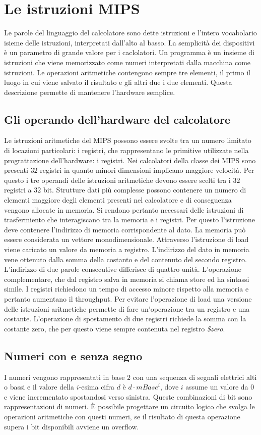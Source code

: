 \chapter{Le istruzioni MIPS}
Le parole del linguaggio del calcolatore sono dette istruzioni e l'intero vocabolario isieme delle istruzioni, interpretati dall'alto al basso. La semplicit\`a dei dispositivi 
\`e un parametro di grande valore per i caclolatori. Un programma \`e un insieme di istruzioni che viene memorizzato come numeri interpretati dalla macchina come istruzioni.
Le operazioni aritmetiche contengono sempre tre elementi, il primo il luogo in cui viene salvato il risultato e gli altri due i due elementi. Questa descrizione permette di 
mantenere l'hardware semplice. 
\section{Gli operando dell'hardware del calcolatore}
Le istruzioni aritmetiche del MIPS possono essere svolte tra un numero limitato di locazioni particolari: i registri, che rappresentano le primitive utilizzate nella 
prograttazione dell'hardware: i registri. Nei calcolatori della classe dei MIPS sono presenti $32$ registri in quanto minori dimensioni implicano maggiore velocit\`a. Per
questo i tre operandi delle istruzioni aritmetiche devono essere scelti tra i $32$ registri a $32$ bit. Strutture dati pi\`u complesse possono contenere un numero di elementi
maggiore degli elementi presenti nel calcolatore e di conseguenza vengono allocate in memoria. Si rendono pertanto necessari delle istruzioni di trasfermiento che interagiscano
tra la memoria e i registri. Per questo l'istruzione deve contenere l'indirizzo di memoria corrispondente al dato. La memoria pu\`o essere considerata un vettore 
monodimensionale. Attraverso l'istruzione di load viene caricato un valore da memoria a registro. L'indirizzo del dato in memoria vene ottenuto dalla somma della costanto e del
contenuto del secondo registro. L'indirizzo di due parole consecutive differisce di quattro unit\`a. L'operazione complementare, che dal registro salva in memoria si chiama 
store ed ha sintassi simile. I registri richiedono un tempo di accesso minore rispetto alla memoria e pertanto aumentano il throughput. Per evitare l'operazione di load una 
versione delle istruzioni aritmetiche permette di fare un'operazione tra un registro e una costante. L'operazione di spostamento di due registri richiede la somma con la 
costante zero, che per questo viene sempre contenuta nel registro \emph{\$zero}.
\section{Numeri con e senza segno}
I numeri vengono rappresentati in base $2$ con una sequenza di segnali elettrici alti o bassi e il valore della $i$-esima cifra $d$ \`e $d\cdot mBase^i$, dove $i$ assume un 
valore da $0$ e viene incrementato spostandosi verso sinistra. Queste combinazioni di bit sono rappresentazioni di numeri. \`E possibile progettare un circuito logico che svolga
le operazioni aritmetiche con questi numeri, se il risultato di questa operazione supera i bit disponibili avviene un overflow.
